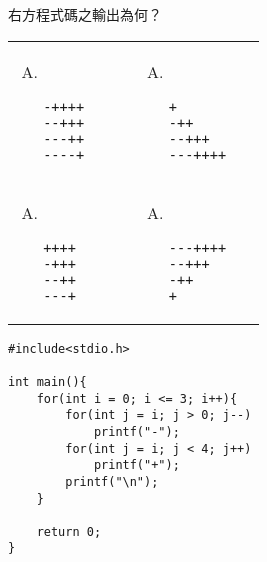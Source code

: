 \begin{TestProblem}

\begin{multicols}{2}

右方程式碼之輸出為何？

\hspace{-0.28cm}
\begin{tabular}{p{0.4\linewidth}p{0.4\linewidth}}

\begin{enumerate}[(A)]
\item ~
\begin{lstlisting}[aboveskip=-0.8\baselineskip, numbers=none]
-++++
--+++
---++
----+
\end{lstlisting}
\end{enumerate} &

\begin{enumerate}[(A), start=2]
\item ~
\begin{lstlisting}[aboveskip=-0.8\baselineskip, numbers=none]
+
-++
--+++
---++++
\end{lstlisting}
\end{enumerate} \\

\vspace{-0.8cm}
\begin{enumerate}[(A), start=3]
\item ~
\begin{lstlisting}[aboveskip=-0.8\baselineskip, numbers=none]
++++
-+++
--++
---+
\end{lstlisting}
\end{enumerate} &

\vspace{-0.8cm}
\begin{enumerate}[(A), start=4]
\item ~
\begin{lstlisting}[aboveskip=-0.8\baselineskip, numbers=none]
---++++
--+++
-++
+
\end{lstlisting}
\end{enumerate}

\end{tabular}

\columnbreak

\begin{lstlisting}
#include<stdio.h>

int main(){
    for(int i = 0; i <= 3; i++){
        for(int j = i; j > 0; j--)
            printf("-");
        for(int j = i; j < 4; j++)
            printf("+");
        printf("\n");
    }

    return 0;
}
\end{lstlisting}

\end{multicols}

\end{TestProblem}